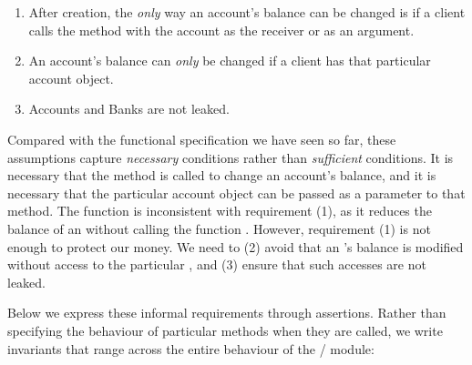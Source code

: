 \begin{enumerate}
\item After creation, the \emph{only} way an account's
  balance can be changed is if a client   calls the  method  with the
  account as the receiver or as an argument. 
\item An account's balance can \emph{only} be changed if a client has
  that particular account object.
\item Accounts and Banks are not leaked.   
\end{enumerate}

Compared with the functional specification we have seen so far, these
assumptions capture \emph{necessary} conditions rather than
\emph{sufficient} conditions. It is necessary that the 
method is called to change an account's balance, and it is necessary
that the particular account object can be passed as a parameter to
that method. The  function 
 is inconsistent with requirement  (1), as it reduces the balance of an  without calling the
function . 
However, requirement  (1) is not enough to protect our money. We need to (2) avoid that an 's balance is
modified without access to the particular , and (3) ensure that such accesses are not leaked. 


 
Below we  express these  informal requirements  %
through \Chainmail assertions.  Rather than %
specifying the behaviour of particular methods when they are called, we
write  invariants   that range across the entire behaviour of the
/  module:
\vspace{.2cm}



